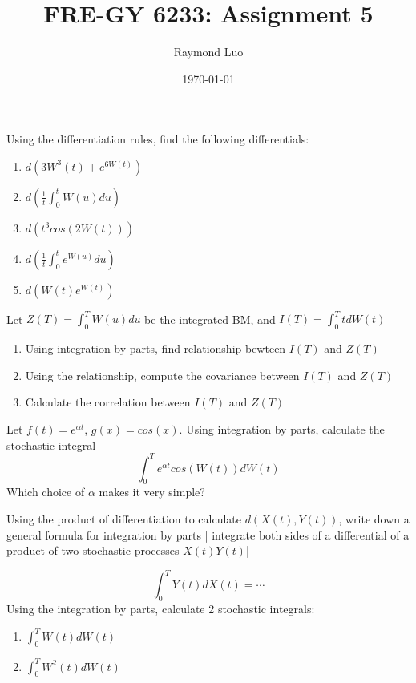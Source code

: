 \documentclass[12pt,twoside, letter]{exam}
\theoremstyle{definition}
\begin{document}
\abovedisplayskip=12pt
\belowdisplayskip=12pt
\abovedisplayshortskip=7pt
\belowdisplayshortskip=10pt
\allowdisplaybreaks

\setlength{\parindent}{18pt}

\title{FRE-GY 6233: Assignment 5}
\author{Raymond Luo}
\date{\today}
\maketitle

\par{Using the differentiation rules, find the following differentials:}

\begin{enumerate}[label = (\alph*)]
  \item $d(3W^{3}(t)  + e^{6W(t)})$
  \item $d(\frac{1}{t} \int^{t}_{0} W(u)du)$
  \item $d(t^3 cos(2W(t)))$
  \item $d(\frac{1}{t}\int^{t}_0 e^{W(u)}du)$
  \item $d(W(t)e^{W(t)})$
\end{enumerate}

Let $Z(T) = \int^{T}_{0} W(u) du$ be the integrated BM, and $I(T) = \int^{T}_{0} tdW(t)$
  \begin{enumerate}[label = (\alph*)]
    \item Using integration by parts, find relationship bewteen $I(T)$ and $Z(T)$
    \item Using the relationship, compute the covariance between $I(T)$ and $Z(T)$
    \item Calculate the correlation between $I(T)$ and $Z(T)$
  \end{enumerate}

Let $f(t) = e^{\alpha t}$, $g(x) = cos(x)$. Using integration by parts, calculate the stochastic integral
  \begin{equation*}
    \int^T_0 e^{\alpha t} cos(W(t)) dW(t)
  \end{equation*}
Which choice of $\alpha$ makes it very simple?

Using the product of differentiation to calculate $d(X(t), Y(t))$, write down a general formula for integration by parts |
integrate both sides of a differential of a product of two stochastic processes $X(t)Y(t)$|

\begin{equation*}
  \int^T_0 Y(t) dX(t) = \cdots
\end{equation*}
Using the integration by parts, calculate 2 stochastic integrals:

\begin{enumerate}
  \item $\int^T_0 W(t)dW(t)$
  \item $\int^T_0 W^2(t)dW(t)$
\end{enumerate}
\end{document}
